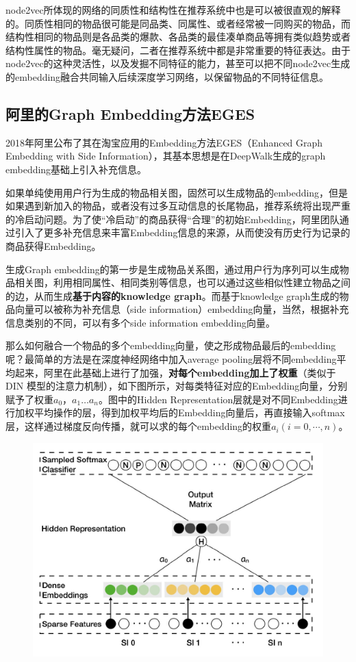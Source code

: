 \documentclass[12pt]{article}
\begin{document}
node2vec所体现的网络的同质性和结构性在推荐系统中也是可以被很直观的解释的。同质性相同的物品很可能是同品类、同属性、或者经常被一同购买的物品，而结构性相同的物品则是各品类的爆款、各品类的最佳凑单商品等拥有类似趋势或者结构性属性的物品。毫无疑问，二者在推荐系统中都是非常重要的特征表达。由于node2vec的这种灵活性，以及发掘不同特征的能力，甚至可以把不同node2vec生成的embedding融合共同输入后续深度学习网络，以保留物品的不同特征信息。

\subsection{阿里的Graph Embedding方法EGES}
2018年阿里公布了其在淘宝应用的Embedding方法EGES（Enhanced Graph Embedding with Side Information），其基本思想是在DeepWalk生成的graph embedding基础上引入补充信息。

如果单纯使用用户行为生成的物品相关图，固然可以生成物品的embedding，但是如果遇到新加入的物品，或者没有过多互动信息的长尾物品，推荐系统将出现严重的冷启动问题。为了使“冷启动”的商品获得“合理”的初始Embedding，阿里团队通过引入了更多补充信息来丰富Embedding信息的来源，从而使没有历史行为记录的商品获得Embedding。

生成Graph embedding的第一步是生成物品关系图，通过用户行为序列可以生成物品相关图，利用相同属性、相同类别等信息，也可以通过这些相似性建立物品之间的边，从而生成\textbf{基于内容的knowledge graph}。而基于knowledge graph生成的物品向量可以被称为补充信息（side information）embedding向量，当然，根据补充信息类别的不同，可以有多个side information embedding向量。

那么如何融合一个物品的多个embedding向量，使之形成物品最后的embedding呢？最简单的方法是在深度神经网络中加入average pooling层将不同embedding平均起来，阿里在此基础上进行了加强，\textbf{对每个embedding加上了权重}（类似于 DIN 模型的注意力机制），如下图所示，对每类特征对应的Embedding向量，分别赋予了权重$a_0，a_1…a_n$。图中的Hidden Representation层就是对不同Embedding进行加权平均操作的层，得到加权平均后的Embedding向量后，再直接输入softmax层，这样通过梯度反向传播，就可以求的每个embedding的权重$a_i(i=0, \cdots, n)$。
\begin{figure}[H]
    \centering
    \includegraphics[width=.6\textwidth]{fig/Graph_Embedding_In_Ali.jpg}
\end{figure}
\end{document}
